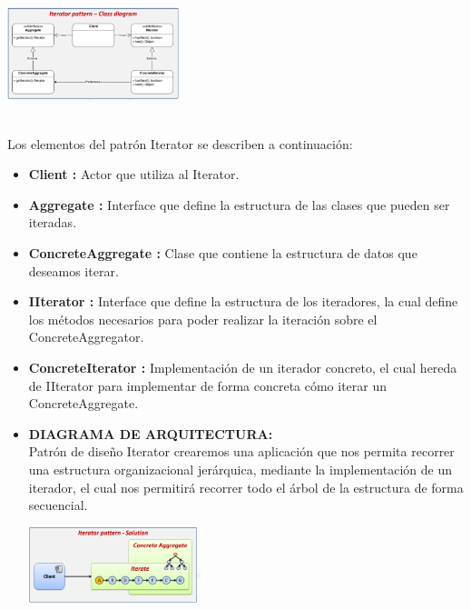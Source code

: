 \documentclass[twoside,twocolumn]{article}
\begin{document}
\begin{itemize}
\begin{itemize}
\begin{itemize}
        \begin{center}
            \includegraphics[width=5cm]{./img/Imagen10.png} 
        \end{center}
        \\
        Los elementos del patrón Iterator se describen a continuación:

        \begin{itemize}
            \item \textbf{Client  :} Actor que utiliza al Iterator.
            \item \textbf{Aggregate  :} Interface que define la estructura de las clases que pueden ser iteradas.
            \item \textbf{ConcreteAggregate  :} Clase que contiene la estructura de datos que deseamos iterar.
            \item \textbf{IIterator  :} Interface que define la estructura de los iteradores, la cual define los métodos necesarios para poder realizar la iteración sobre el ConcreteAggregator.
            \item \textbf{ConcreteIterator  :} Implementación de un iterador concreto, el cual hereda de IIterator para implementar de forma concreta cómo iterar un ConcreteAggregate.
            \end{itemize} 


        \begin{itemize}
        \item \textbf{DIAGRAMA DE ARQUITECTURA:}	\\
        Patrón de diseño Iterator crearemos una aplicación que nos permita recorrer una estructura organizacional jerárquica, mediante la implementación de un iterador, el cual nos permitirá recorrer todo el árbol de la estructura de forma secuencial.
        \begin{center}
            \includegraphics[width=5cm]{./img/Imagen11.png} 
        \end{center}
        \\


\end{itemize}
\end{itemize}
\end{itemize}
\end{itemize}
\end{document}
